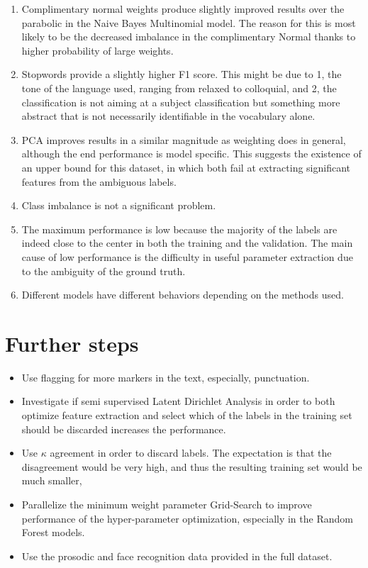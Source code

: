 \documentclass[12pt,a4paper]{report}
\begin{document}
\begin{enumerate}
\item Complimentary normal weights produce slightly improved results over the parabolic in the Naive Bayes Multinomial model. The reason for this is most likely to be the decreased imbalance in the complimentary Normal thanks to higher probability of large weights.
\item Stopwords provide a slightly higher F1 score. This might be due to 1, the tone of the language used, ranging from relaxed to colloquial, and 2, the classification is not aiming at a subject classification but something more abstract that is not necessarily identifiable in the vocabulary alone.
\item PCA improves results in a similar magnitude as weighting does in general, although the end performance is model specific. This suggests the existence of an upper bound for this dataset, in which both fail at extracting significant features from the ambiguous labels.
\item Class imbalance is not a significant problem.
\item The maximum performance is low because the majority of the labels are indeed close to the center in both the training and the validation. The main cause of low performance is the difficulty in useful parameter extraction due to the ambiguity of the ground truth.
\item Different models have different behaviors depending on the methods used.

\end{enumerate}

\section{Further steps}

\begin{itemize}
\item Use flagging for more markers in the text, especially, punctuation.

\item Investigate if semi supervised Latent Dirichlet Analysis in order to both optimize feature extraction and select which of the labels in the training set should be discarded increases the performance.
\item Use $\kappa$ agreement in order to discard labels. The expectation is that the disagreement would be very high, and thus the resulting training set would be much smaller, \cite{chalearn}
\item Parallelize the minimum weight parameter Grid-Search to improve performance of the hyper-parameter optimization, especially in the Random Forest models.
\item Use the prosodic and face recognition data provided in the full dataset.
\end{itemize}
\end{document}

